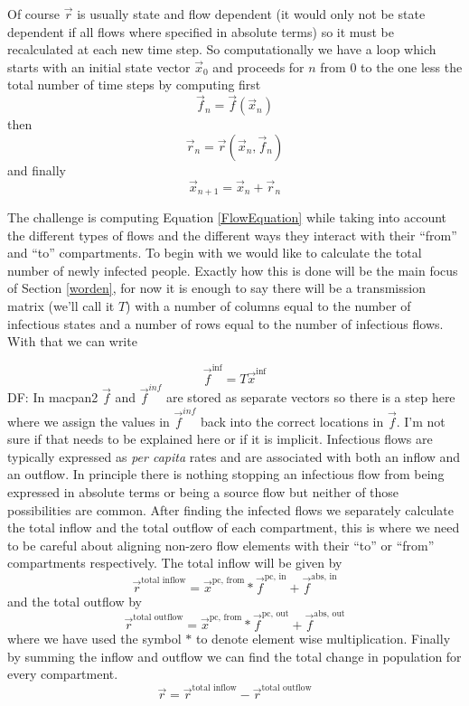 \documentclass[referee,sn-basic]{sn-jnl}%
\theoremstyle{definition}
\newcommand{\df}[1]{{\color{orange} DF: #1}}
\newcommand{\xvec}{\vec{x}}
\newcommand{\fvec}{\vec{f}}
\newcommand{\rvec}{\vec{r}}
\begin{document}
Of course $\rvec$ is usually state and flow dependent (it would only not be state dependent if all flows where specified in absolute terms) so it must be recalculated at each new time step. So computationally we have a loop which starts with an initial state vector $\xvec_0$ and proceeds for $n$ from 0 to the one less the total number of time steps by computing first
\[
    \fvec_n = \fvec(\xvec_n)
\]
then
\begin{equation}\label{FlowEquation}
    \rvec_n = \rvec(\xvec_n, \fvec_n)
\end{equation}
and finally
\[
    \xvec_{n+1} = \xvec_n + \rvec_n
\]

The challenge is computing Equation \ref{FlowEquation} while taking into account the different types of flows and the different ways they interact with their ``from'' and ``to'' compartments. To begin with we would like to calculate the total number of newly infected people. Exactly how this is done will be the main focus of Section \ref{worden}, for now it is enough to say there will be a transmission matrix (we'll call it $T$) with a number of columns equal to the number of infectious states and a number of rows equal to the number of infectious flows. With that we can write
    
\begin{equation}\label{infectionequation}
\fvec^\text{inf} = T\xvec^\text{inf}
\end{equation}
\df{In macpan2 $\fvec$ and $\fvec^{inf}$ are stored as separate vectors so there is a step here where we assign the values in $\fvec^{inf}$ back into the correct locations in $\fvec$. I'm not sure if that needs to be explained here or if it is implicit.}
Infectious flows are typically expressed as \emph{per capita} rates and are associated with both an inflow and an outflow. In principle there is nothing stopping an infectious flow from being expressed in absolute terms or being a source flow but neither of those possibilities are common. After finding the infected flows we separately calculate the total inflow and the total outflow of each compartment, this is where we need to be careful about aligning non-zero flow elements with their ``to'' or ``from'' compartments respectively. The total inflow will be given by
\[
    \rvec^\text{total inflow} = \xvec^\text{pc, from} * \fvec^\text{pc, in} + \fvec^\text{abs, in}
\]
and the total outflow by     
\[
    \rvec^\text{total outflow} = \xvec^\text{pc, from} * \fvec^\text{pc, out} + \fvec^\text{abs, out}
\]
where we have used the symbol $*$ to denote element wise multiplication. Finally by summing the inflow and outflow we can find the total change in population for every compartment.
\[
\rvec = \rvec^\text{total inflow} - \rvec^\text{total outflow}
\]     
\end{document}
